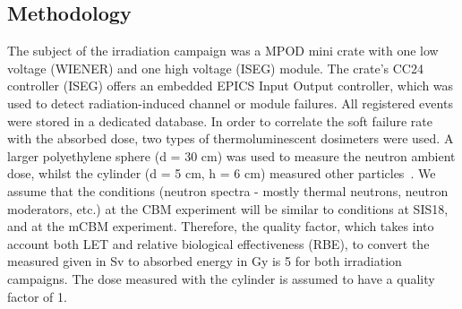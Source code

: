 \subsection{Methodology}
The subject of the irradiation campaign was a MPOD mini crate with one low voltage (WIENER) and one high voltage (ISEG) module. The crate's CC24 controller (ISEG) offers an embedded EPICS Input Output controller, which was used to detect radiation-induced channel or module failures. All registered events were stored in a dedicated database. In order to correlate the soft failure rate with the absorbed dose, two types of thermoluminescent dosimeters were used. A larger polyethylene sphere (d = 30 cm) was used to measure the neutron ambient dose, whilst the cylinder (d = 5 cm, h = 6 cm) measured other particles~\cite{bonner}. We assume that the conditions (neutron spectra - mostly thermal neutrons, neutron moderators, etc.) at the \gls{CBM} experiment will be similar to conditions at SIS18, and at the mCBM experiment. Therefore, the quality factor, which takes into account both \gls{LET} and relative biological effectiveness (\gls{RBE}), to convert the measured given in Sv to absorbed energy in Gy is 5 for both irradiation campaigns. The dose measured with the cylinder is assumed to have a quality factor of 1.

